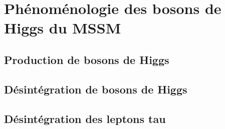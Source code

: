 \section{Phénoménologie des bosons de Higgs du MSSM}
\subsection{Production de bosons de Higgs}
\subsection{Désintégration de bosons de Higgs}
\subsection{Désintégration des leptons tau}
